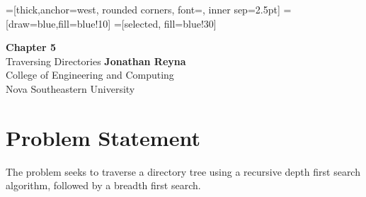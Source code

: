 \documentclass[12pt,sffamily]{article}
\begin{document}
=[thick,anchor=west, rounded corners, font={\scriptsize\ttfamily}, inner sep=2.5pt]
=[draw=blue,fill=blue!10]
=[selected, fill=blue!30]

\begin{titlepage}
    \begin{center}
        \vspace*{1cm}
        \Huge
        \textbf{Chapter 5}\\
        \vspace{0.5cm}
        \LARGE
        Traversing Directories
        \vfill
        \Large
        \textbf{Jonathan Reyna}\\
        College of Engineering and Computing\\
        Nova Southeastern University\\
        \usdate{\today}
    \end{center}
\end{titlepage}

\section{Problem Statement}
The problem seeks to traverse a directory tree using a recursive depth
first search algorithm, followed by a breadth first search.\\
\end{document}
